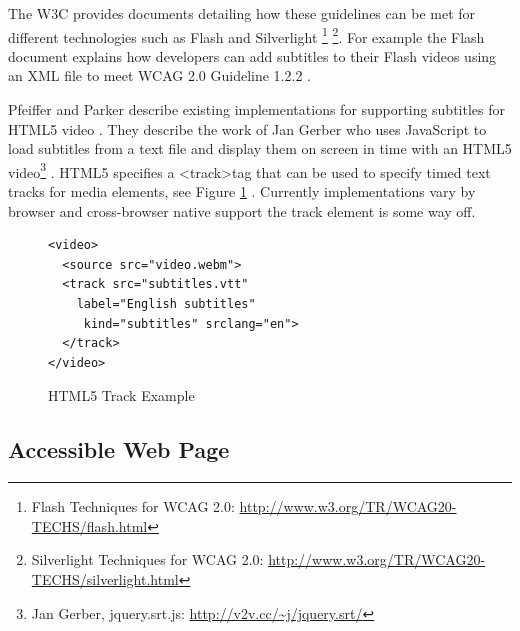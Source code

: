 \documentclass[journal]{IEEEtran}
\begin{document}
The W3C provides documents detailing how these guidelines can be met for different technologies such as Flash and Silverlight \footnote{Flash Techniques for WCAG 2.0: \url{http://www.w3.org/TR/WCAG20-TECHS/flash.html}} \footnote{Silverlight Techniques for WCAG 2.0: \url{http://www.w3.org/TR/WCAG20-TECHS/silverlight.html}}. For example the Flash document explains how developers can add subtitles to their Flash videos using an XML file to meet WCAG 2.0 Guideline 1.2.2 \cite{website:flashTechniquesForWCAG}.

Pfeiffer and Parker describe existing implementations for supporting subtitles for HTML5 video \cite{inproceedings:accessibilityForTheHTML5VideoElement}. They describe the work of Jan Gerber who uses JavaScript to load subtitles from a text file and display them on screen in time with an HTML5 video\footnote{Jan Gerber, jquery.srt.js: \url{http://v2v.cc/~j/jquery.srt/}} \cite{inproceedings:accessibilityForTheHTML5VideoElement}. HTML5 specifies a \textless track\textgreater tag that can be used to specify timed text tracks for media elements, see Figure \ref{lst:trackExample} \cite{standard:html5}. Currently implementations vary by browser and cross-browser native support the track element is some way off. %


\begin{figure}
\label{lst:trackExample}
\caption{HTML5 Track Example}
\begin{lstlisting}[frame=single]
<video>
  <source src="video.webm">
  <track src="subtitles.vtt"
    label="English subtitles"
     kind="subtitles" srclang="en">
  </track>
</video>
\end{lstlisting}
\end{figure}


\subsection{Accessible Web Page}
\end{document}
